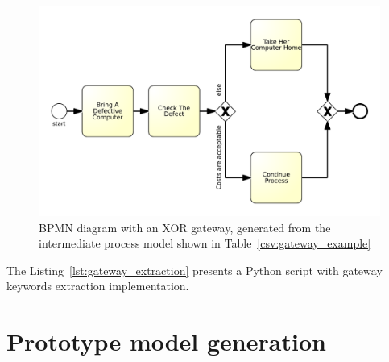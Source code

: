 \begin{figure}[H]
	\centering
	\includegraphics[scale=0.55]{./images/gateway_example.pdf}
	\caption{BPMN diagram with an XOR gateway, generated from the intermediate process model shown in Table~\ref{csv:gateway_example}}
	\label{fig:gateway_example}
\end{figure}
The Listing~\ref{lst:gateway_extraction} presents a Python script with gateway keywords extraction implementation.


\section{Prototype model generation}

